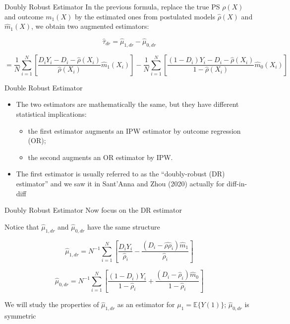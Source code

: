 \documentclass{beamer}
\begin{document}
\begin{frame}{Doubly Robust Estimator}
    In the previous formula, replace the true PS \( \rho(X) \) and outcome
    \( m_1(X) \) by the estimated ones from postulated models \( \hat{\rho}(X) \) and
    \( \hat{m}_1(X) \), we obtain two augmented estimators:

    \[
    \widehat{\tau}_{dr} = \hat{\mu}_{1,dr} - \hat{\mu}_{0,dr}
    \]

\footnotesize
    \[
    = \frac{1}{N} \sum_{i=1}^{N} \left[ \frac{D_iY_i - D_i - \hat{\rho}(X_i)}{\hat{\rho}(X_i)} \hat{m}_1(X_i) \right]
    - \frac{1}{N} \sum_{i=1}^{N} \left[ \frac{(1 - D_i)Y_i - D_i - \hat{\rho}(X_i)}{1 - \hat{\rho}(X_i)} \hat{m}_0(X_i) \right]
    \]

\end{frame}

\begin{frame}{Double Robust Estimator}

\begin{itemize}

\item     The two estimators are mathematically the same, but they have different statistical implications:
    	\begin{itemize}
	\item  the first estimator augments an IPW estimator by outcome regression (OR); 
	\item the second augments an OR estimator by IPW.
	\end{itemize}
\item The first estimator is usually referred to as the ``doubly-robust (DR) estimator'' and we saw it in Sant'Anna and Zhou (2020) actually for diff-in-diff

\end{itemize}
\end{frame}


\begin{frame}{Doubly Robust Estimator}
    Now focus on the DR estimator

    Notice that \( \hat{\mu}_{1,dr} \) and \( \hat{\mu}_{0,dr} \) have the same structure

    \[
    \hat{\mu}_{1,dr} = N^{-1} \sum_{i=1}^{N} \left[ \frac{D_iY_i}{\hat{\rho}_i} - \frac{(D_i - \hat{\rho\rho}_i)\hat{m}_1}{\hat{\rho}_i} \right]
    \]

    \[
    \hat{\mu}_{0,dr} = N^{-1} \sum_{i=1}^{N} \left[ \frac{(1 - D_i)Y_i}{1 - \hat{\rho}_i} + \frac{(D_i - \hat{\rho}_i)\hat{m}_0}{1 - \hat{\rho}_i} \right]
    \]

    We will study the properties of \( \hat{\mu}_{1,dr} \) as an estimator for \( \mu_1 = \mathbb{E}\{Y(1)\} \); \( \hat{\mu}_{0,dr} \) is symmetric
\end{frame}
\end{document}
